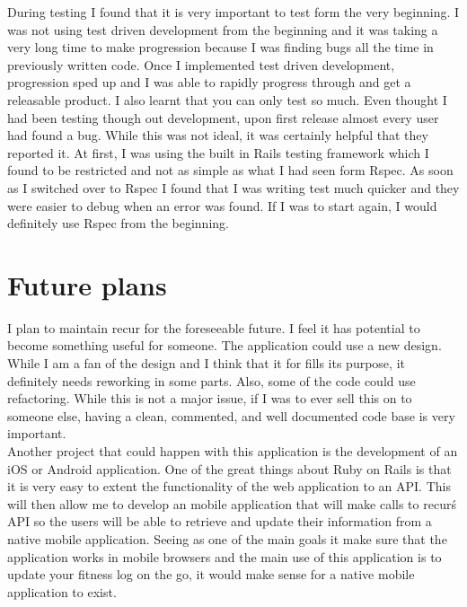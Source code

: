 During testing I found that it is very important to test form the very beginning. I was not using test driven development from the beginning and it was taking a very long time to make progression because I was finding bugs all the time in previously written code. Once I implemented test driven development, progression sped up and I was able to rapidly progress through and get a releasable product. I also learnt that you can only test so much. Even thought I had been testing though out development, upon first release almost every user had found a bug. While this was not ideal, it was certainly helpful that they reported it. At first, I was using the built in Rails testing framework which I found to be restricted and not as simple as what I had seen form Rspec. As soon as I switched over to Rspec I found that I was writing test much quicker and they were easier to debug when an error was found. If I was to start again, I would definitely use Rspec from the beginning.

\section{Future plans}
I plan to maintain recur for the foreseeable future. I feel it has potential to become something useful for someone. The application could use a new design. While I am a fan of the design and I think that it for fills its purpose, it definitely needs reworking in some parts. Also, some of the code could use refactoring. While this is not a major issue, if I was to ever sell this on to someone else, having a clean, commented, and well documented code base is very important. \\

Another project that could happen with this application is the development of an iOS or Android application. One of the great things about Ruby on Rails is that it is very easy to extent the functionality of the web application to an API. This will then allow me to develop an mobile application that will make calls to recur\'s API so the users will be able to retrieve and update their information from a native mobile application. Seeing as one of the main goals it make sure that the application works in mobile browsers and the main use of this application is to update your fitness log on the go, it would make sense for a native mobile application to exist. 
